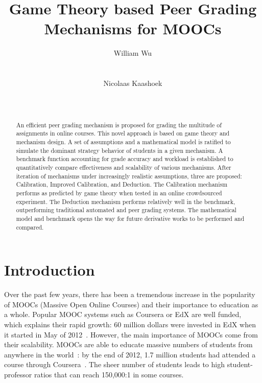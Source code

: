 \documentclass{sigchi}
\begin{document}
\title{Game Theory based Peer Grading Mechanisms for MOOCs}

\author{
  \alignauthor William Wu\\
    \\
    \\
  \alignauthor Nicolaas Kaashoek\\
    \\
    \\
}

\maketitle

\begin{abstract}
An efficient peer grading mechanism is proposed for grading the multitude of assignments in online courses. This novel approach is based on game theory and mechanism design. A set of assumptions and a mathematical model is ratified to simulate the dominant strategy behavior of students in a given mechanism. A benchmark function accounting for grade accuracy and workload is established to quantitatively compare effectiveness and scalability of various mechanisms. After iteration of mechanisms under increasingly realistic assumptions, three are proposed: Calibration, Improved Calibration, and Deduction. The Calibration mechanism performs as predicted by game theory when tested in an online crowdsourced experiment. The Deduction mechanism performs relatively well in the benchmark, outperforming traditional automated and peer grading systems. The mathematical model and benchmark opens the way for future derivative works to be performed and compared.
\end{abstract}



\section{Introduction}
Over the past few years, there has been a tremendous increase in the popularity of MOOCs (Massive Open Online Courses) and their importance to education as a whole. Popular MOOC systems such as Coursera or EdX are well funded, which explains their rapid growth: 60 million dollars were invested in EdX when it started in May of 2012~\cite{canMOOCsreducecc}. However, the main importance of MOOCs come from their scalability. MOOCs are able to educate massive numbers of students from anywhere in the world~\cite{makingsenseofMOOCs}: by the end of 2012, 1.7 million students had attended a course through Coursera~\cite{swotanalysisofMOOCs}. The sheer number of students leads to high student-professor ratios that can reach 150,000:1 in some courses.
\end{document}
